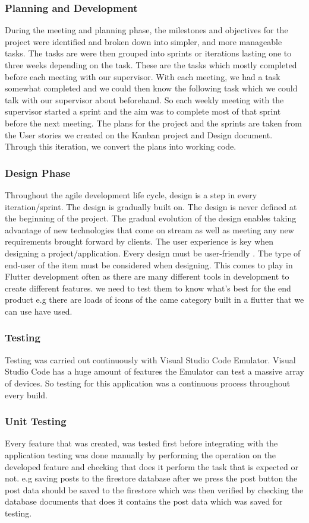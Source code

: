 \subsubsection{Planning and Development}
During the meeting and planning phase, the milestones and objectives for the
project were identified and broken down into simpler, and more manageable tasks. The tasks are were then grouped into sprints or iterations lasting one
to three weeks depending on the task. These are the tasks which mostly completed before each meeting with our supervisor. With each meeting, we had a task somewhat completed and we could then know the following task which we could
talk with our supervisor about beforehand. So each weekly meeting with the
supervisor started a sprint and the aim was to complete most of that sprint
before the next meeting. The plans for the project and the sprints are taken
from the User stories we created on the Kanban project and Design document.
Through this iteration, we convert the plans into working code.
\subsubsection{Design Phase}
Throughout the agile development life cycle, design is a step in every iteration/sprint. The design is gradually built on. The design is never defined at the beginning of the project. The gradual evolution of the design enables taking advantage of new technologies that come on stream as well as meeting any
new requirements brought forward by clients. The user experience is key when
designing a project/application. Every design must be user-friendly \cite{AgileSof90:online}. The type of end-user of the item must be considered when designing. This comes to play in Flutter development often as there are many different tools in development to create different features. we need to test them to know what's best for the end product e.g there are loads of icons of the came category built in a flutter that we can use have used.
\subsubsection{Testing}
Testing was carried out continuously with Visual Studio Code Emulator. Visual Studio Code has a huge amount of features the Emulator can test
a massive array of devices. So testing for this application was a continuous
process throughout every build.
\subsubsection{Unit Testing}
Every feature that was created, was tested first before integrating with the application testing was done manually by performing the operation on the developed feature and checking that does it perform the task that is expected or not. e.g saving posts to the firestore database after we press the post button the post data should be saved to the firestore which was then verified by checking the database documents that does it contains the post data which was saved for testing.
